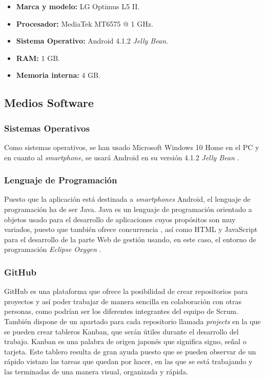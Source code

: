 \documentclass{pre-tfg}
\begin{document}
\begin{itemize}
	\item \textbf{Marca y modelo:} LG Optimus L5 II.
	\item \textbf{Procesador:} MediaTek MT6575 @ 1 GHz.
	\item \textbf{Sistema Operativo:} Android 4.1.2 \textit{Jelly Bean}.
	\item \textbf{RAM:} 1 GB.
	\item \textbf{Memoria interna:} 4 GB.
\end{itemize}

\subsection{Medios Software}

\subsubsection*{Sistemas Operativos}
Como sistemas operativos, se han usado Microsoft Windows 10 Home \cite{Microsoft} en el PC y en cuanto al \textit{smartphone}, se usará Android en su versión 4.1.2 \textit{Jelly Bean} \cite{Andro}.

\subsubsection*{Lenguaje de Programación}
Puesto que la aplicación está destinada a \textit{smartphones} Android, el lenguaje de programación ha de ser Java. Java es un lenguaje de programación orientado a objetos usado para el desarrollo de aplicaciones cuyos propósitos son muy variados, puesto que también ofrece concurrencia \cite{Java}, así como HTML y JavaScript para el desarrollo de la parte Web de gestión usando, en este caso, el entorno de programación \textit{Eclipse Oxygen} \cite{EclipseFoundation2018}.

\clearpage

\subsubsection*{GitHub}
GitHub es una plataforma que ofrece la posibilidad de crear repositorios para proyectos y así poder trabajar de manera sencilla en colaboración con otras personas, como podrían ser los diferentes integrantes del equipo de Scrum. También dispone de un apartado para cada repositorio llamada \textit{projects} en la que se pueden crear tableros Kanban, que serán útiles durante el desarrollo del trabajo. Kanban \cite{Gomez2017} es una palabra de origen japonés que significa signo, señal o tarjeta. Este tablero resulta de gran ayuda puesto que se pueden observar de un rápido vistazo las tareas que quedan por hacer, en las que se está trabajando y las terminadas de una manera visual, organizada y rápida.
\end{document}
